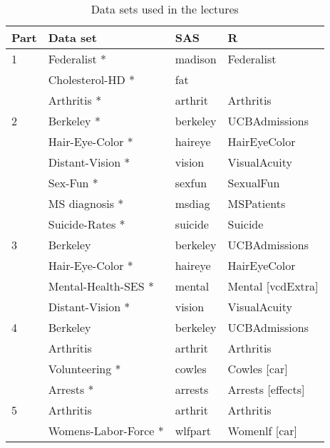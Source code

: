 
\begin{table}[htb]
\begin{center}
\renewcommand{\arraystretch}{0.85}
	\caption{Data sets used in the lectures}\label{tab:dataset-table}
\begin{tabular}{ll>{\ttfamily}l>{\ttfamily}l}
  \hline
Part &  Data set           &  SAS        & R           \\[0.5ex]  \hline   \hline
1    & Federalist *        &  madison    & Federalist  \\
     & Cholesterol-HD *    &  fat        &             \\
     & Arthritis *         &  arthrit    & Arthritis   \\[1ex]
%
2    & Berkeley *          & berkeley   & UCBAdmissions \\
     & Hair-Eye-Color *    & haireye    & HairEyeColor \\
     & Distant-Vision *    & vision     & VisualAcuity \\
     & Sex-Fun *           & sexfun     & SexualFun    \\
     & MS diagnosis *      & msdiag     & MSPatients   \\
     & Suicide-Rates *     & suicide    & Suicide      \\[1ex]
3    & Berkeley            & berkeley   & UCBAdmissions \\
     & Hair-Eye-Color *    & haireye    & HairEyeColor \\
     & Mental-Health-SES * & mental     & Mental [vcdExtra] \\
     & Distant-Vision *    & vision     & VisualAcuity \\[1ex]
4    & Berkeley            & berkeley    & UCBAdmissions \\
     & Arthritis           & arthrit     & Arthritis   \\
     & Volunteering *      & cowles      & Cowles [car] \\
	 & Arrests *           & arrests     & Arrests [effects]\\[1ex]
5    & Arthritis           &  arthrit    & Arthritis   \\
     & Womens-Labor-Force * & wlfpart     & Womenlf [car] \\    \hline
\end{tabular}
\end{center}
\end{table}
